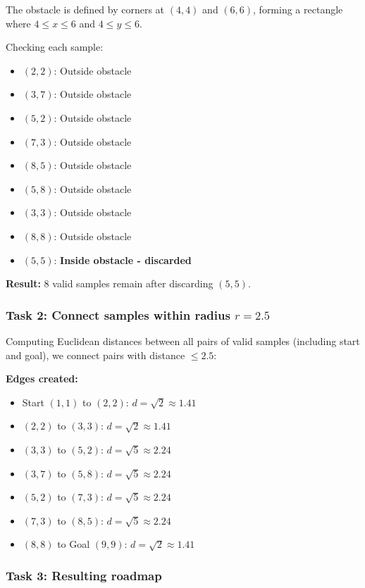 \documentclass[11pt]{article}
\begin{document}
The obstacle is defined by corners at $(4,4)$ and $(6,6)$, forming a rectangle where $4 \leq x \leq 6$ and $4 \leq y \leq 6$.

Checking each sample:
\begin{itemize}
    \item $(2,2)$: Outside obstacle
    \item $(3,7)$: Outside obstacle
    \item $(5,2)$: Outside obstacle
    \item $(7,3)$: Outside obstacle
    \item $(8,5)$: Outside obstacle
    \item $(5,8)$: Outside obstacle
    \item $(3,3)$: Outside obstacle
    \item $(8,8)$: Outside obstacle
    \item $(5,5)$: \textbf{Inside obstacle - discarded}
\end{itemize}

\textbf{Result:} 8 valid samples remain after discarding $(5,5)$.

\subsubsection*{Task 2: Connect samples within radius $r = 2.5$}

Computing Euclidean distances between all pairs of valid samples (including start and goal), we connect pairs with distance $\leq 2.5$:

\textbf{Edges created:}
\begin{itemize}
    \item Start $(1,1)$ to $(2,2)$: $d = \sqrt{2} \approx 1.41$
    \item $(2,2)$ to $(3,3)$: $d = \sqrt{2} \approx 1.41$
    \item $(3,3)$ to $(5,2)$: $d = \sqrt{5} \approx 2.24$
    \item $(3,7)$ to $(5,8)$: $d = \sqrt{5} \approx 2.24$
    \item $(5,2)$ to $(7,3)$: $d = \sqrt{5} \approx 2.24$
    \item $(7,3)$ to $(8,5)$: $d = \sqrt{5} \approx 2.24$
    \item $(8,8)$ to Goal $(9,9)$: $d = \sqrt{2} \approx 1.41$
\end{itemize}

\subsubsection*{Task 3: Resulting roadmap}
\end{document}
